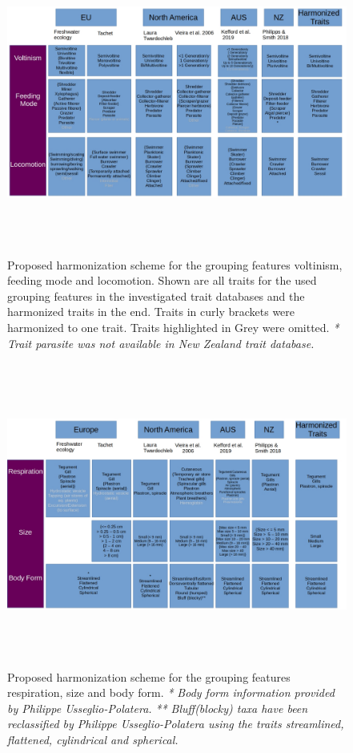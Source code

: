 \documentclass{article}
\begin{document}
\begin{figure}[H]
   \centering
   \includegraphics[width=16.5cm, height=10cm]{trait_overview1.jpg}
   \caption{Proposed harmonization scheme for the grouping features
   voltinism, feeding mode and locomotion. Shown are all traits for the 
   used grouping features in the investigated trait databases and 
   the harmonized traits in the end. Traits in curly brackets were 
   harmonized to one trait. Traits highlighted in Grey were omitted. \newline
   \textit{* Trait parasite was not available in New Zealand trait database.}
   }
   \label{fig:harmon_overview_1}
\end{figure}

\begin{figure}[H]
    \centering
    \includegraphics[width=16.5cm, height=10cm]{trait_overview2.jpg}
    \caption{Proposed harmonization scheme for the grouping features
    respiration, size and body form.\newline
    \textit{* Body form information provided by Philippe 
    Usseglio-Polatera.}\newline
    \textit{** Bluff(blocky) taxa have been reclassified
    by Philippe Usseglio-Polatera using the traits streamlined,
    flattened, cylindrical and spherical.} }
    \label{fig:harmon_overview_2}
 \end{figure}
 
\end{document}

